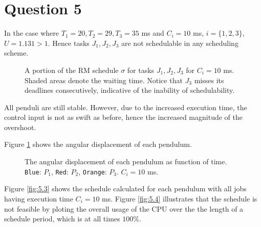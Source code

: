 \section{Question 5}
In the case where $T_1 = 20, T_2 = 29, T_3 = 35$ ms and $C_i = 10$ ms,
$i=\{1,2,3\}$, $U=1.131 > 1$. Hence tasks $J_1, J_2, J_3$ are not schedulable
in any scheduling scheme.


\begin{figure}[H]\centering
  \scalebox{0.7}{}
  \caption{A portion of the RM schedule $\sigma$ for tasks $J_1, J_2, J_3$ for
    $C_i = 10$ ms.  Shaded areas denote the waiting time. Notice that $J_3$
    misses its deadlines consecutively, indicative of the inability of
    schedulability.}
\end{figure}

All penduli are still stable. However, due to the increased execution time, the
control input is not as swift as before, hence the increased magnitude of the
overshoot.

Figure \ref{fig:5.2} shows the angular displacement of each pendulum.



\begin{figure}[H]\centering
  \scalebox{1}{}
  \caption{The angular displacement of each pendulum as function of time.
    \texttt{Blue}: $P_1$, \texttt{Red}: $P_2$, \texttt{Orange}: $P_3$.
    $C_i = 10$ ms.}
  \label{fig:5.2}
\end{figure}

Figure \ref{fig:5.3} shows the schedule calculated for each pendulum with all
jobs having execution time $C_i = 10$ ms.  Figure \ref{fig:5.4} illustrates that
the schedule is not feasible by ploting the overall usage of the CPU over the
the length of a schedule period, which is at all times $100\%$.


\noindent{}
